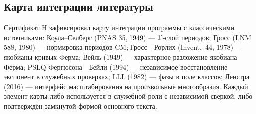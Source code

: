 \subsection{Карта интеграции литературы}

Сертификат H зафиксировал карту интеграции программы с
классическими источниками: Коула--Селберг (PNAS 35, 1949) ---
$\Gamma$-слой периодов; Гросс (LNM 588, 1980) --- нормировка периодов
CM; Гросс---Рорлих (Invent.\ 44, 1978) --- якобианы кривых Ферма;
Вейль (1949) --- характерное разложение якобиана Ферма;
PSLQ Фергюсона---Бейли (1994) --- независимое восстановление
экспонент в служебных проверках; LLL (1982) --- фазы в поле
классов; Ленстра (2016) --- интерфейс масштабирования на
произвольные многообразия. Каждый элемент карты либо используется в
служебной роли с независимой сверкой, либо подтверждён замкнутой
формой основного текста.
